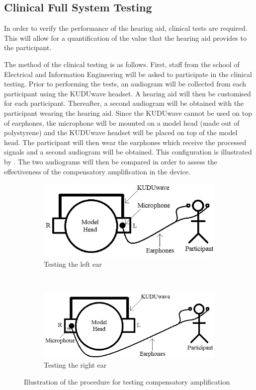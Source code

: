 \documentclass[10pt,twocolumn]{witseiepaper}
\begin{document}
\subsection{Clinical Full System Testing} \label{sec:clinical}
In order to verify the performance of the hearing aid, clinical tests are required. This will allow for a quantification of the value that the hearing aid provides to the participant.

The method of the clinical testing is as follows. First, staff from the school of Electrical and Information Engineering will be asked to participate in the clinical testing. Prior to performing the tests, an audiogram will be collected from each participant using the KUDUwave headset. A hearing aid will then be customised for each participant. Thereafter, a second audiogram will be obtained with the participant wearing the hearing aid. Since the KUDUwave cannot be used on top of earphones, the microphone will be mounted on a model head (made out of polystyrene) and the KUDUwave headset will be placed on top of the model head. The participant will then wear the earphones which receive the processed signals and a second audiogram will be obtained. This configuration is illustrated by . The two audiograms will then be compared in order to assess the effectiveness of the compensatory amplification in the device.

\begin{figure}[h]
	\centering
	\begin{subfigure}[t]{0.5\textwidth}
		\centering
		\includegraphics[width=0.8\columnwidth]{gainTestingLeft.png}
		\caption{Testing the left ear}
	\end{subfigure}%
	\\
	\begin{subfigure}[t]{0.5\textwidth}
		\centering
		\includegraphics[width=0.8\columnwidth]{gainTestingRight.png}
		\caption{Testing the right ear}
	\end{subfigure}
	\caption{Illustration of the procedure for testing compensatory amplification}
	\label{fig:testing}	
\end{figure}
\end{document}
